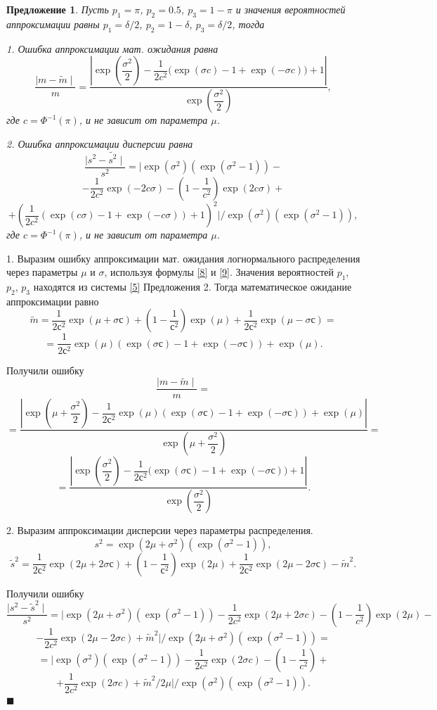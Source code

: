 \documentclass[12pt]{article}
\newtheorem{proposition}[theorem]{Предложение}
\newenvironment{Proof}{\par\noindent{\bf Доказательство.}}{\hfill$\scriptstyle\blacksquare$}
\begin{document}
	\begin{proposition}\label{pr7}
		Пусть $p_{1} = \pi$, $p_{2} = 0.5$, $p_{3} = 1-\pi$ и значения вероятностей аппроксимации равны $p_{1} = \delta/2$, $p_{2} = 1-\delta$, $p_{3} = \delta/2$, тогда
		
		1. Ошибка аппроксимации мат. ожидания равна
		\[\dfrac{\mid m - \widetilde{m} \mid}{m}  = \dfrac{\left|\exp\left(\dfrac{\sigma^{2}}{2}\right) - \dfrac{1}{2c^{2}}\bigg(\exp(\sigma c)-1 +\exp(-\sigma c)\bigg) + 1\right|}{\exp\left(\dfrac{\sigma^{2}}{2}\right)},\]
		где $c = \Phi^{-1}(\pi)$, и не зависит от параметра $\mu$.
		
		2. Ошибка аппроксимации дисперсии равна
		\[\dfrac{\mid s^{2} - \widetilde{s^{2}} \mid}{s^{2}} = \biggl|\exp(\sigma^{2})(\exp(\sigma^{2}-1)) -\]\[- \dfrac{1}{2c^{2}}\exp(-2c\sigma)- \left( 1- \dfrac{1}{c^{2}}\right) \exp(2c\sigma)+\]\[+ \left( \dfrac{1}{2c^{2}}(\exp(c\sigma)-1+\exp(-c\sigma)) + 1\right) ^{2}\biggr| /\exp(\sigma^{2})(\exp(\sigma^{2}-1)),\]
		где $c = \Phi^{-1}(\pi)$, и не зависит от параметра $\mu$.
		
	\end{proposition}
	\begin{Proof}
		1. Выразим ошибку аппроксимации мат. ожидания логнормального распределения через параметры $\mu$ и $\sigma$, используя формулы \eqref{8} и \eqref{9}. Значения вероятностей $p_{1}$, $p_{2}$, $p_{3}$ находятся из системы \eqref{5} Предложения 2. Тогда математическое ожидание аппроксимации равно
		\[\tilde{m} = \dfrac{1}{2с^{2}}\exp(\mu+\sigma с)+\left(1 - \dfrac{1}{с^{2}}\right)\exp(\mu)+ \dfrac{1}{2с^{2}}\exp(\mu-\sigma с)=\]
		\[= \dfrac{1}{2с^{2}} \exp(\mu)(\exp(\sigma с)-1+\exp(-\sigma с)) + \exp(\mu). \]
		
		Получили ошибку
		\[\dfrac{\mid m - \widetilde{m} \mid}{m} = \]\[=\dfrac{\left| \exp\left(\mu+\dfrac{\sigma^{2}}{2}\right) - \dfrac{1}{2с^{2}} \exp(\mu)(\exp(\sigma с)-1 +\exp(-\sigma с)) + \exp(\mu) \right|}{\exp\left(\mu+\dfrac{\sigma^{2}}{2}\right)}=\]
		\[=\dfrac{\left| \exp\left(\dfrac{\sigma^{2}}{2}\right) - \dfrac{1}{2с^{2}} \bigg(\exp(\sigma с)-1 +\exp(-\sigma с)\bigg) + 1 \right|}{\exp\left(\dfrac{\sigma^{2}}{2}\right)}.\]
		
		2. Выразим аппроксимации дисперсии через параметры распределения.
		\[s^{2} = \exp(2\mu+\sigma^{2})(\exp(\sigma^{2}-1)),\]
		\[\tilde{s}^{2} = \dfrac{1}{2с^{2}}\exp(2\mu+2\sigma с)+\left(1 - \dfrac{1}{с^{2}}\right)\exp(2\mu)+ \dfrac{1}{2с^{2}}\exp(2\mu-2\sigma с) - \tilde{m}^{2}.\]
		
		Получили ошибку
		\[\dfrac{\mid s^{2} - \widetilde{s}^{2} \mid}{s^{2}} = \biggl| \exp(2\mu+\sigma^{2})(\exp(\sigma^{2}-1)) - \dfrac{1}{2c^{2}}\exp(2\mu+2\sigma c)- \left(1 - \dfrac{1}{c^{2}}\right)\exp(2\mu)-\]
		\[-\dfrac{1}{2c^{2}}\exp(2\mu-2\sigma c) + \tilde{ m}^{2}\biggr|/\exp(2\mu+\sigma^{2})(\exp(\sigma^{2}-1))=\]
		\[=\biggl| \exp(\sigma^{2})(\exp(\sigma^{2}-1)) - \dfrac{1}{2c^{2}}\exp(2\sigma c)- \left(1 - \dfrac{1}{c^{2}}\right)+\]
		\[+\dfrac{1}{2c^{2}}\exp(2\sigma c) + \tilde{ m}^{2}/2\mu\biggr|/\exp(\sigma^{2})(\exp(\sigma^{2}-1)).\]
	\end{Proof}
\end{document}

